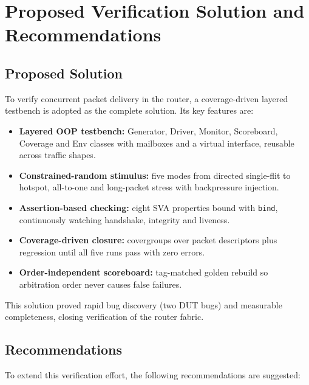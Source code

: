 \documentclass[11pt,a4paper]{report}  %
\begin{document}
\section{Proposed Verification Solution and Recommendations}

\subsection{Proposed Solution}

To verify concurrent packet delivery in the router, a coverage-driven layered
testbench is adopted as the complete solution. Its key features are:

\begin{itemize}
    \item \textbf{Layered OOP testbench:} Generator, Driver, Monitor,
    Scoreboard, Coverage and Env classes with mailboxes and a virtual
    interface, reusable across traffic shapes.
    \item \textbf{Constrained-random stimulus:} five modes from directed
    single-flit to hotspot, all-to-one and long-packet stress with
    backpressure injection.
    \item \textbf{Assertion-based checking:} eight SVA properties bound with
    \texttt{bind}, continuously watching handshake, integrity and liveness.
    \item \textbf{Coverage-driven closure:} covergroups over packet descriptors
    plus regression until all five runs pass with zero errors.
    \item \textbf{Order-independent scoreboard:} tag-matched golden rebuild so
    arbitration order never causes false failures.
\end{itemize}

This solution proved rapid bug discovery (two DUT bugs) and measurable
completeness, closing verification of the router fabric.

\subsection{Recommendations}

To extend this verification effort, the following recommendations are suggested:
\end{document}
